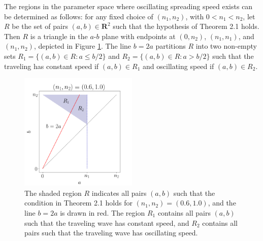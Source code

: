 \documentclass[11pt]{article}
\numberwithin{equation}{section}
\theoremstyle{definition}
\begin{document}
The regions in the parameter space where oscillating spreading speed exists can be determined as follows: for any fixed choice of $(n_1,n_2)$, with $0<n_1<n_2$, let $R$ be the set of pairs $(a,b)\in\mathbf R^2$ such that the hypothesis of Theorem 2.1 holds. Then $R$ is a triangle in the $a$-$b$ plane with endpoints at $(0,n_2)$, $(n_1,n_1)$, and $(n_1,n_2)$, depicted in Figure \ref{fig:phaseportrait}. The line $b=2a$ partitions $R$ into two non-empty sets $R_1=\{(a,b)\in R:a\leq b/2\}$ and $R_2=\{(a,b)\in R:a> b/2\}$ such that the traveling has constant speed if $(a,b)\in R_1$ and oscillating speed if $(a,b)\in R_2$.


\begin{figure}
\begin{center}
\includegraphics[width=0.5\textwidth]{fig4}
\end{center}
\caption{The shaded region $R$ indicates all pairs $(a,b)$ such that the condition in Theorem 2.1 holds for $(n_1,n_2)=(0.6,1.0)$, and the line $b=2a$ is drawn in red. The region $R_1$ contains all pairs $(a,b)$ such that the traveling wave has constant speed, and $R_2$ contains all pairs such that the traveling wave has oscillating speed.}
\label{fig:phaseportrait}
\end{figure}
\end{document}
